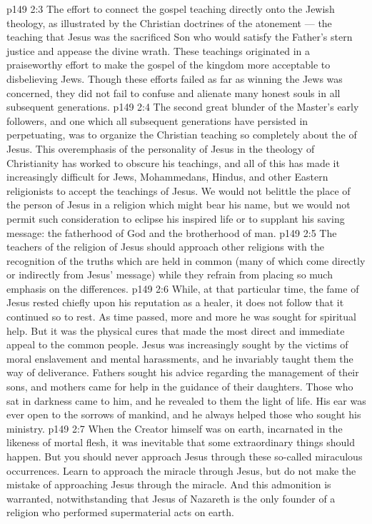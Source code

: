 \vs p149 2:3 \bibnobreakspace The effort to connect the gospel teaching directly onto the Jewish theology, as illustrated by the Christian doctrines of the atonement --- the teaching that Jesus was the sacrificed Son who would satisfy the Father’s stern justice and appease the divine wrath. These teachings originated in a praiseworthy effort to make the gospel of the kingdom more acceptable to disbelieving Jews. Though these efforts failed as far as winning the Jews was concerned, they did not fail to confuse and alienate many honest souls in all subsequent generations.
\vs p149 2:4 \bibnobreakspace The second great blunder of the Master’s early followers, and one which all subsequent generations have persisted in perpetuating, was to organize the Christian teaching so completely about the  of Jesus. This overemphasis of the personality of Jesus in the theology of Christianity has worked to obscure his teachings, and all of this has made it increasingly difficult for Jews, Mohammedans, Hindus, and other Eastern religionists to accept the teachings of Jesus. We would not belittle the place of the person of Jesus in a religion which might bear his name, but we would not permit such consideration to eclipse his inspired life or to supplant his saving message: the fatherhood of God and the brotherhood of man.
\vs p149 2:5 \pc The teachers of the religion of Jesus should approach other religions with the recognition of the truths which are held in common (many of which come directly or indirectly from Jesus’ message) while they refrain from placing so much emphasis on the differences.
\vs p149 2:6 \pc While, at that particular time, the fame of Jesus rested chiefly upon his reputation as a healer, it does not follow that it continued so to rest. As time passed, more and more he was sought for spiritual help. But it was the physical cures that made the most direct and immediate appeal to the common people. Jesus was increasingly sought by the victims of moral enslavement and mental harassments, and he invariably taught them the way of deliverance. Fathers sought his advice regarding the management of their sons, and mothers came for help in the guidance of their daughters. Those who sat in darkness came to him, and he revealed to them the light of life. His ear was ever open to the sorrows of mankind, and he always helped those who sought his ministry.
\vs p149 2:7 When the Creator himself was on earth, incarnated in the likeness of mortal flesh, it was inevitable that some extraordinary things should happen. But you should never approach Jesus through these so\hyp{}called miraculous occurrences. Learn to approach the miracle through Jesus, but do not make the mistake of approaching Jesus through the miracle. And this admonition is warranted, notwithstanding that Jesus of Nazareth is the only founder of a religion who performed supermaterial acts on earth.
